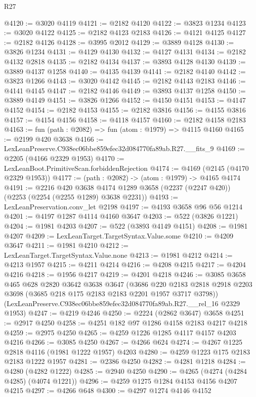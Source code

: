 \begin{lexlean}{R27}
\begin{coremodule}
@4120 := @3020 @4119
@4121 := @2182 @4120
@4122 := @3823 @1234
@4123 := @3020 @4122
@4125 := @2182 @4123 @2183
@4126 := @4121 @4125
@4127 := @2182 @4126
@4128 := @3995 @2012
@4129 := @3889 @4128
@4130 := @3826 @1234
@4131 := @4129 @4130
@4132 := @4127 @4131
@4134 := @2182 @4132 @2818
@4135 := @2182 @4134
@4137 := @3893 @4128 @4130
@4139 := @3889 @4137 @1258
@4140 := @4135 @4139
@4141 := @2182 @4140
@4142 := @3823 @1266
@4143 := @3020 @4142
@4145 := @2182 @4143 @2183
@4146 := @4141 @4145
@4147 := @2182 @4146
@4149 := @3893 @4137 @1258
@4150 := @3889 @4149
@4151 := @3826 @1266
@4152 := @4150 @4151
@4153 := @4147 @4152
@4154 := @2182 @4153
@4155 := @2182 @3816
@4156 := @4155 @3816
@4157 := @4154 @4156
@4158 := @4118 @4157
@4160 := @2182 @4158 @2183
@4163 := fun (path : @2082) => fun (atom : @1979) => @4115 @4160
@4165 := @2199 @420 @3638
@4166 := LexLeanPreserve.C938ec06bbe859efec32d084770fa89ab.R27.__fits_9
@4169 := @2205 (@4166 @2329 @1953)
@4170 := LexLeanBoot.PrimitiveScan.forbiddenRejection
@4174 := @4169 (@2145 (@4170 @2329 @1953))
@4177 := (path : @2082) -> (atom : @1979) -> @4165 @4174
@4191 := @2216
    @420
    @3638
    @4174
    @1289
    @3658
    (@2237 (@2247 @420))
    (@2253 (@2254 (@2255 @1289) @3638 @2231))
@4193 := LexLeanPreservation.conv_let @2198
@4197 := @4193 @3658 @96 @56 @1214
@4201 := @4197 @1287 @4114 @4160 @3647
@4203 := @522 (@3826 @1221)
@4204 := @1981 @4203
@4207 := @522 (@3893 @4149 @4151)
@4208 := @1981 @4207
@4209 := LexLeanTarget.TargetSyntax.Value.some
@4210 := @4209 @3647
@4211 := @1981 @4210
@4212 := LexLeanTarget.TargetSyntax.Value.none
@4213 := @1981 @4212
@4214 := @4213 @1957
@4215 := @4211 @4214
@4216 := @4208 @4215
@4217 := @4204 @4216
@4218 := @1956 @4217
@4219 := @4201 @4218
@4246 := @3085
    @3658
    @465
    @628
    @2820
    @3642
    @3638
    @3647
    (@3686 @220 @2183 @2818 @2918 @2203 @3698 (@3685 @218 @175 @2183 @2183 @2201 @1957 @3717 @3798))
    (LexLeanPreserve.C938ec06bbe859efec32d084770fa89ab.R27.__rel_16 @2329 @1953)
@4247 := @4219 @4246
@4250 := @2224 (@2862 @3647) @3658
@4251 := @2917 @4250
@4258 := @4251 @182 @97 @1286 @4158 @2183 @4217 @4218
@4259 := @2975 @4250
@4265 := @4259 @1226 @1285 @4117 @4157 @4203 @4216
@4266 := @3085 @4250
@4267 := @4266 @624
@4274 := @4267 @1225 @2818 @4116 (@1981 @1222 @1957) @4203
@4280 := @4259 @1223 @175 @2183 @2183 @1222 @1957
@4281 := @2386 @4250
@4282 := @4281 @1218
@4284 := @4280 (@4282 @1222)
@4285 := @2940 @4250
@4290 := @4265 (@4274 (@4284 @4285) (@4074 @1221))
@4296 := @4259 @1275 @1284 @4153 @4156 @4207 @4215
@4297 := @4266 @648
@4300 := @4297 @1274 @4146 @4152

\end{coremodule}
\end{lexlean}
